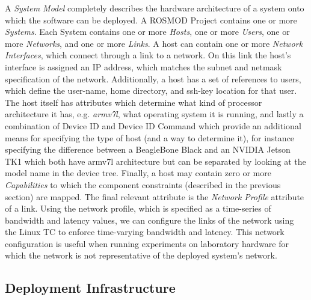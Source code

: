 A \emph{System Model} completely describes the hardware architecture of a system onto which the software can be deployed. A ROSMOD Project contains one or more \emph{Systems}. Each System contains one or more \emph{Hosts}, one or more \emph{Users}, one or more \emph{Networks}, and one or more \emph{Links}.  A host can contain one or more \emph{Network Interfaces}, which connect through a link to a network.  On this link the host's interface is assigned an IP address, which matches the subnet and netmask specification of the network. Additionally, a host has a set of references to users, which define the user-name, home directory, and ssh-key location for that user. The host itself has attributes which determine what kind of processor architecture it has, e.g. \emph{armv7l}, what operating system it is running, and lastly a combination of Device ID and Device ID Command which provide an additional means for specifying the type of host (and a way to determine it), for instance specifying the difference between a BeagleBone Black and an NVIDIA Jetson TK1 which both have armv7l architecture but can be separated by looking at the model name in the device tree.  Finally, a host may contain zero or more \emph{Capabilities} to which the component constraints (described in the previous section) are mapped.  The final relevant attribute is the \emph{Network Profile} attribute of a link. Using the network profile, which is specified as a time-series of bandwidth and latency values, we can configure the links of the network using the Linux TC to enforce time-varying bandwidth and latency. This network configuration is useful when running experiments on laboratory hardware for which the network is not representative of the deployed system's
network.

\subsection{Deployment Infrastructure}
\label{sec:Deployment_Infrastructure}

